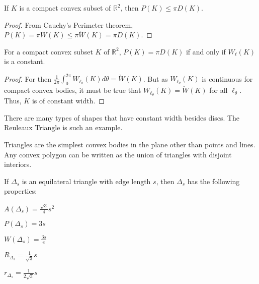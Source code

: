 \documentclass[crop=false,class=article,oneside]{standalone}
\begin{document}
        \begin{theorem}
        If $K$ is a compact convex subset of $\mathbb{R}^2$, then $P(K) \leq \pi D(K)$.
        \end{theorem}
        \begin{proof}
        From Cauchy's Perimeter theorem, $P(K) = \pi W(K) \leq \pi \check{W}(K) = \pi D(K)$.
        \end{proof}
        \begin{theorem}
        For a compact convex subset $K$ of $\mathbb{R}^2$, $P(K) = \pi D(K)$ if and only if $W_{\ell}(K)$ is a constant.
        \end{theorem}
        \begin{proof}
        For then $\frac{1}{2\pi} \int_{0}^{2\pi} W_{\ell_{\theta}}(K) d\theta = \check{W}(K)$. But as $W_{\ell_{\theta}}(K)$ is continuous for compact convex bodies, it must be true that $W_{\ell_{\theta}}(K) = \check{W}(K)$ for all $\ell_{\theta}$. Thus, $K$ is of constant width.
        \end{proof}
        \begin{remark}
        There are many types of shapes that have constant width besides discs. The Reuleaux Triangle is such an example.
        \end{remark}
        Triangles are the simplest convex bodies in the plane other than points and lines. Any convex polygon can be written as the union of triangles with disjoint interiors. 
        \begin{theorem}
        If $\Delta_s$ is an equilateral triangle with edge length $s$, then $\Delta_s$ has the following properties:
        \begin{enumerate}
        \begin{multicols}{5}
        \item $A(\Delta_s) = \frac{\sqrt{3}}{4}s^2$
        \item $P(\Delta_s) = 3s$
        \item $W(\Delta_s) = \frac{3s}{\pi}$
        \item $R_{\Delta_s} = \frac{1}{\sqrt{3}}s$
        \item $r_{\Delta_s} = \frac{1}{2\sqrt{3}}s$
        \end{multicols}
        \end{enumerate}
        \end{theorem}
\end{document}
